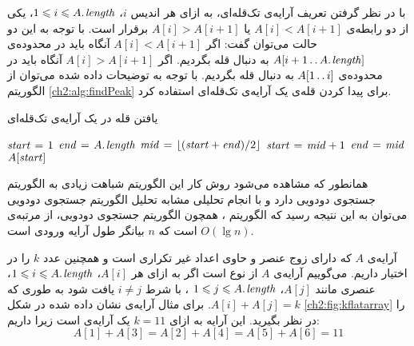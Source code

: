 
با در نظر گرفتن تعریف آرایه‌ی تک‌قله‌ای، به ازای هر اندیس {$i$}، {$1 \leqslant i \leqslant A.\hspace*{1pt}\mathit{length}$}، یکی از دو رابطه‌ی {$A[i] < A[i+1]$} یا {$A[i]>A[i+1]$} برقرار است. با توجه به این دو حالت می‌توان گفت:
 اگر {$A[i]<A[i+1]$} آنگاه باید در محدوده‌ی {$A[i+1\mathinner{\ldotp\ldotp} A.\hspace*{1pt}\mathit{length}]$} به دنبال قله بگردیم.
 اگر {$A[i]>A[i+1]$} آنگاه باید در محدوده‌ی {$A[1\mathinner{\ldotp\ldotp} i]$} به دنبال قله بگردیم.
با توجه به توضیحات داده شده می‌توان از الگوریتم {\eqref{ch2:alg:findPeak}} برای پیدا کردن قله‌ی یک آرایه‌ی تک‌قله‌ای استفاده کرد.
\begin{algorithm}
\caption{یافتن قله در یک آرایه‌ی تک‌قله‌ای}\label{ch2:alg:findPeak}
\begin{latin}
\begin{algorithmic}[1]
		\State	$\mathit{start} \mathrel{\hspace{1pt}=\hspace{1pt}} 1$
		\State	$\mathit{end} \mathrel{\hspace{1pt}=\hspace{1pt}} A.\hspace*{1pt}\mathit{length}$
				\State	$\mathit{mid} \mathrel{\hspace{1pt}=\hspace{1pt}} \lfloor(\mathit{start}+\mathit{end}) / 2\rfloor$
						\State	$\mathit{start} \mathrel{\hspace{1pt}=\hspace{1pt}} \mathit{mid}+1$
				\EndIf
						\State	$\mathit{end} \mathrel{\hspace{1pt}=\hspace{1pt}} \mathit{mid}$
				\EndIf
		\EndWhile
		\State	\Return $A[\mathit{start}]$	
\EndFunction
\end{algorithmic}
\end{latin}
\end{algorithm}

همانطور که مشاهده می‌شود روش کار این الگوریتم شباهت زیادی به الگوریتم جستجوی دودویی دارد و با انجام تحلیلی مشابه تحلیل الگوریتم جستجوی دودویی می‌توان به این نتیجه رسید که الگوریتم {}، همچون الگوریتم جستجوی دودویی، از مرتبه‌ی {$O(\lg n)$} است که {$n$} بیانگر طول آرایه ورودی است.

 آرایه‌ی {$A$} که دارای زوج عنصر و حاوی اعداد غیر تکراری است  و همچنین عدد {$k$} را در اختیار داریم. می‌گوییم آرایه‌ی {$A$} از نوع
 {} است اگر به ازای هر {$A[i]$}، {$1\leqslant i\leqslant A.\hspace*{1pt}\mathit{length}$}، عنصری مانند {$A[j]$}،
{$1\leqslant j\leqslant A.\hspace*{1pt}\mathit{length}$}
، با شرط {$i \neq j$} یافت شود به طوری که {$A[i]+A[j]=k$}. برای مثال آرایه‌ی نشان داده شده در شکل {\eqref{ch2:fig:kflatarray}} را در نظر بگیرید. این آرایه به ازای {$k=11$} یک آرایه‌ی {} است زیرا داریم:
\begin{displaymath}
A[1]+A[3]=A[2]+A[4]=A[5]+A[6]=11
\end{displaymath}

